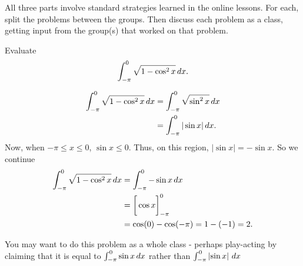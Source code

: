 \documentclass[handout]{ximera}
\begin{document}
\begin{instructorNotes}
All three parts involve standard strategies learned in the online lessons.  
For each, split the problems between the groups.  
Then discuss each problem as a class, getting input from the group(s) that worked on that problem.
\end{instructorNotes}







\begin{problem}
Evaluate
	\[
	\int_{- \pi}^0 \sqrt{1 - \cos^2 x} \,d x.
	\]
	\begin{freeResponse}
		\begin{align*}
		\int_{- \pi}^0 \sqrt{1 - \cos^2 x} \,d x
		&= \int_{- \pi}^0 \sqrt{\sin^2 x} \,d x  \\
		&= \int_{- \pi}^0 | \sin x | \,d x.
		\end{align*}
	Now, when $-\pi \leq x \leq 0$, $\sin x \leq 0$.  
	Thus, on this region, $|\sin x | = - \sin x$.
	So we continue
		\begin{align*}
		\int_{- \pi}^0 \sqrt{1 - \cos^2 x} \,d x
		&= \int_{- \pi}^0 - \sin x \,d x  \\
		&= \bigg[ \cos x \bigg]_{-\pi}^0  \\
		&= \cos(0) - \cos(-\pi) = 1 - (-1) = 2.
		\end{align*}
	\end{freeResponse}
		
\end{problem}

\begin{instructorNotes}
You may want to do this problem as a whole class - perhaps play-acting by claiming that it is equal to $\int_{-\pi}^0 \sin x \,d x$ rather than $\int_{-\pi}^0 \left| \sin x \right|  \,d x$
\end{instructorNotes}
\end{document}
